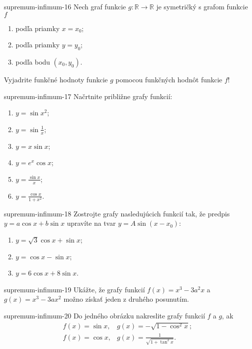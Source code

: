\begin{defproblem}{supremum-infimum-16}
Nech graf funkcie $g:\mathbb{R}\rightarrow\mathbb{R}$ je symetričký s grafom funkcie $f$
\begin{enumerate}
\item podľa priamky $x=x_0$;
\item podľa priamky $y=y_0$;
\item podľa bodu $(x_0,y_0)$.
\end{enumerate}
Vyjadrite funkčné hodnoty funkcie $g$ pomocou funkčných hodnôt funkcie $f$!
\end{defproblem}

\begin{defproblem}{supremum-infimum-17}
Načrtnite približne grafy funkcií:
\begin{multicols}{2}
\begin{enumerate}
    \item $y=\sin x^2$;
    \item $y=\sin \frac{1}{x}$;
    \item $y=x\sin x$;
    \item $y=e^x\cos x$;
    \item $y=\frac{\sin x}{x}$;
    \item $y=\frac{\cos x}{1+x^2}$.
\end{enumerate}
\end{multicols}
\end{defproblem}

\begin{defproblem}{supremum-infimum-18}
Zostrojte grafy nasledujúcich funkcií tak, že predpis $y=a\cos x +b\sin x$ upravíte na tvar $y=A\sin (x-x_0)$:
\begin{enumerate}
\item $y=\sqrt{3}\cos x +\sin x$;
\item $y=\cos x -\sin x$;
\item $y=6\cos x +8\sin x$.
\end{enumerate}
\end{defproblem}

\begin{defproblem}{supremum-infimum-19}
Ukážte, že grafy funkcií $f(x)=x^3-3a^2x$ a $g(x)=x^3-3ax^2$ možno získať jeden z druhého posunutím.
\end{defproblem}

\begin{defproblem}{supremum-infimum-20}
Do jedného obrázku nakreslite grafy funkcií $f$ a $g$, ak
\begin{align*}
f(x)=\sin x,& g(x)=-\sqrt{1-\cos^2 x};\\
f(x)=\cos x,& g(x)=\frac{1}{\sqrt{1+\tan^2 x}}.
\end{align*}
\end{defproblem}

